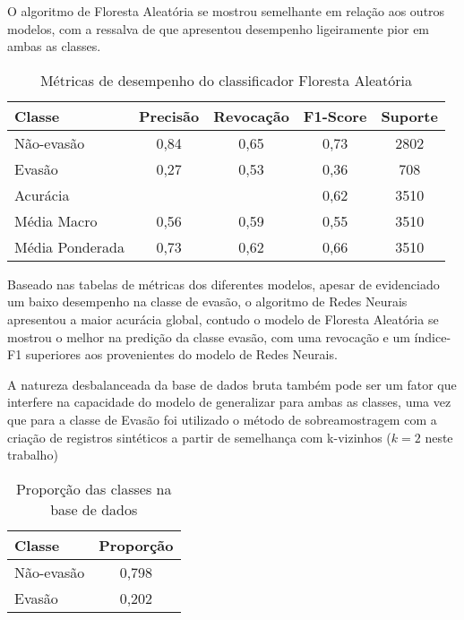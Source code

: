 \documentclass[english, spanish, brazilian]{RBIEarticle} %
\begin{document}
O algoritmo de Floresta Aleatória se mostrou semelhante em relação aos outros modelos, com a ressalva de que apresentou desempenho ligeiramente pior em ambas as classes.

\vspace{0.5cm}
\begin{table}[htbp]
\centering
\label{tab:metricas2}
\begin{tabular}{lcccc}
\hline
Classe        & Precisão & Revocação & F1-Score & Suporte \\ \hline
Não-evasão           & 0,84     & 0,65      & 0,73     & 2802    \\
Evasão           & 0,27     & 0,53      & 0,36     & 708     \\ \hline
Acurácia      &          &           & 0,62     & 3510    \\
Média Macro   & 0,56     & 0,59      & 0,55     & 3510    \\
Média Ponderada & 0,73   & 0,62      & 0,66     & 3510    \\ \hline
\end{tabular}
\caption{Métricas de desempenho do classificador Floresta Aleatória}
\end{table}
\vspace{0.5cm}

Baseado nas tabelas de métricas dos diferentes modelos, apesar de evidenciado um baixo desempenho na classe de evasão, o algoritmo de Redes Neurais apresentou a maior acurácia global, contudo o modelo de Floresta Aleatória se mostrou o melhor na predição da classe evasão, com uma revocação e um índice-F1 superiores aos provenientes do modelo de Redes Neurais.

A natureza desbalanceada da base de dados bruta também pode ser um fator que interfere na capacidade do modelo de generalizar para ambas as classes, uma vez que para a classe de Evasão foi utilizado o método de sobreamostragem com a criação de registros sintéticos a partir de semelhança com k-vizinhos ($k=2$ neste trabalho)

\vspace{0.5cm}
\begin{table}[htbp]
\centering
\label{tab:proporcao}
\begin{tabular}{lc}
\hline
Classe & Proporção \\ \hline
Não-evasão  & 0,798 \\ 
Evasão      & 0,202 \\ \hline
\end{tabular}
\caption{Proporção das classes na base de dados}
\end{table}
\vspace{0.5cm}
\end{document}

